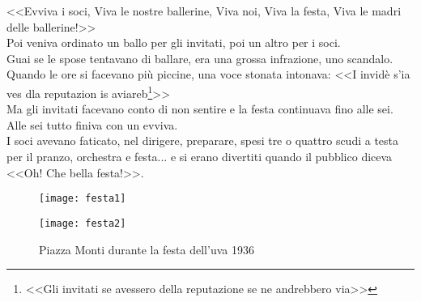 \indent <<Evviva i soci, Viva le nostre ballerine, Viva noi, Viva la festa, Viva le madri delle ballerine!>>\\
\indent Poi veniva ordinato un ballo per gli invitati, poi un altro per i soci.\\
\indent Guai se le spose tentavano di ballare, era una grossa infrazione, uno scandalo.\\
\indent Quando le ore si facevano più piccine, una voce stonata intonava: <<I invidè s'ia ves dla reputazion is aviareb\footnote{<<Gli invitati se avessero della reputazione se ne andrebbero via>>}>>\\
\indent Ma gli invitati facevano conto di non sentire e la festa continuava fino alle sei. Alle sei tutto finiva con un evviva.\\
\indent I soci avevano faticato, nel dirigere, preparare, spesi tre o quattro scudi a testa per il pranzo, orchestra e festa... e si erano divertiti quando il pubblico diceva <<Oh! Che bella festa!>>.

 \begin{figure}[htb]
    \centering
        \texttt{[image: festa1]}
    \vspace{-0.75cm}
\end{figure}
 \begin{figure}[htb]
    \centering
    \vspace{-0.5cm}
    \texttt{[image: festa2]}
    \caption[Festa dell'uva]{Piazza Monti durante la festa dell'uva 1936\label{fig:festa2}}
    \vspace{-0.5cm}
\end{figure}

